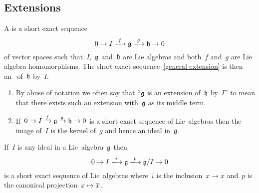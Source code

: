 \subsection{Extensions}





\begin{definition}
  A  is a short exact sequence
  \begin{equation}
    \label{general extension}
    0 
    \to
    I
    \xlongto{f}
    \glie
    \xlongto{g}
    \hlie
    \to
    0
  \end{equation}
  of vector spaces such that~$I$,~$\mathfrak{g}$ and~$\mathfrak{h}$ are Lie algebras and both~$f$ and~$g$ are Lie algebra homomorphisms.
  The short exact sequence~\eqref{general extension} is then an~ of~$\mathfrak{h}$ by~$I$.
\end{definition}


\begin{remark}
  \leavevmode
  \begin{enumerate}
    \item
      By abuse of notation we often say that \enquote{$\mathfrak{g}$ is an extension of~$\mathfrak{h}$ by~$I$} to mean that there exists such an extension with~$\mathfrak{g}$ as its middle term.
    \item
      If~$0 \to I \xrightarrow{f} \mathfrak{g} \xrightarrow{g} \mathfrak{h} \to 0$ is a short exact sequence of Lie~algebras then the image of~$I$ is the kernel of~$g$ and hence an ideal in~$\mathfrak{g}$.
  \end{enumerate}
\end{remark}


\begin{example}
  If~$I$ is any ideal in a Lie~algebra~$\mathfrak{g}$ then
  \[
    0
    \to
    I
    \xlongto{i}
    \glie
    \xlongto{p}
    \glie/I
    \to
    0
  \]
  is a short exact sequence of Lie~algebras where~$i$ is the inclusion~$x \to x$ and~$p$ is the canonical projection~$x \mapsto \overline{x}$.
\end{example}



